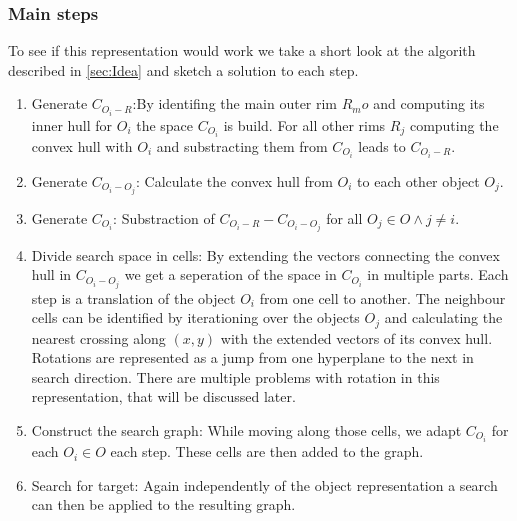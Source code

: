 \subsubsection{Main steps}
To see if this representation would work we take a short look at the algorith described in \ref{sec:Idea} and sketch a solution to each step.
\begin{enumerate}
\item Generate $C_{O_i-R}$:By identifing the main outer rim $R_mo$ and computing its inner hull for $O_i$ the space $C_{O_i}$ is build. For all other rims $R_j$ computing the convex hull with $O_i$ and substracting them from $C_{O_i}$ leads to $C_{O_i-R}$.
\item Generate $C_{O_i-O_j}$: Calculate the convex hull from $O_i$ to each other object $O_j$.
\item Generate $C_{O_i}$: Substraction of $C_{O_i-R} - C_{O_i-O_j}$ for all $O_j \in O \wedge j \neq i$.
\item Divide search space in cells: By extending the vectors connecting the convex hull in $C_{O_i-O_j}$ we get a seperation of the space in $C_{O_i}$ in multiple parts. Each step is a translation of the object $O_i$  from one cell to another. The neighbour cells can be identified by iterationing over the objects $O_j$ and calculating the nearest crossing along $(x,y)$ with the extended vectors of its convex hull. \\ Rotations are represented as a jump from one hyperplane to the next in search direction. There are multiple problems with rotation in this representation, that will be discussed later.
\item Construct the search graph: While moving along those cells, we adapt $C_{O_i}$ for each $O_i \in O$ each step. These cells are then added to the graph.
\item Search for target: Again independently of the object representation a search can then be applied to the resulting graph. 
\end{enumerate}


